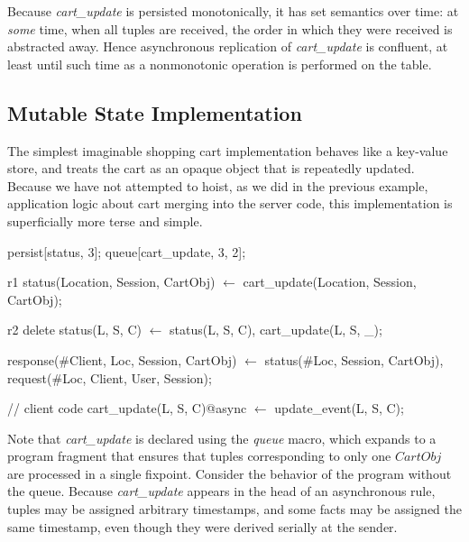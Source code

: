 Because {\em cart\_update} is persisted monotonically, it has set semantics over time: at
{\em some} time, when all tuples are received, the order in which they were received is
abstracted away.  Hence asynchronous replication of {\em cart\_update} is confluent,
at least until such time as a nonmonotonic operation is performed on the table.


\subsection{Mutable State Implementation}

The simplest imaginable shopping cart implementation behaves like a key-value store,
and treats the cart as an opaque object that is repeatedly updated.    Because we have not
attempted to hoist, as we did in the previous example, application logic about cart merging
into the server code, this implementation is superficially more terse and simple.

\begin{Dedalus}
persist[status, 3];
queue[cart_update, 3, 2];

r1
status(Location, Session, CartObj) \(\leftarrow\)
    cart_update(Location,  Session, CartObj);
    
r2
delete status(L, S, C) \(\leftarrow\)
    status(L, S, C), cart_update(L, S, _);
  
response(#Client, Loc, Session, CartObj) \(\leftarrow\)
    status(#Loc, Session, CartObj),
    request(#Loc, Client, User, Session);

// client code
cart_update(L, S, C)@async \(\leftarrow\) 
    update_event(L, S, C);
\end{Dedalus}

Note that 
{\em cart\_update} is declared using the {\em queue} macro, which expands to
a program fragment that ensures that tuples corresponding to only one $CartObj$
are processed in a single fixpoint. 
Consider the behavior of the program without the queue.  Because {\em
cart\_update} appears in the head of an asynchronous rule,
 tuples may be assigned arbitrary timestamps, and some
 facts may be assigned the same timestamp, even though
they were derived serially at the sender.  

